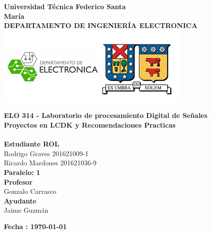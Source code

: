 \documentclass[12pt,a4paper]{article} %
\begin{document}
\begin{titlepage}
\begin{center}
\textbf{\LARGE Universidad Técnica Federico Santa}\\[0.25cm]
\textbf{\LARGE María}\\[0.5cm]
\textbf{\large DEPARTAMENTO DE INGENIERÍA ELECTRONICA}\\[0.2cm]
\vspace{20pt}
\includegraphics{logousm.png}\\[1cm]

\par
\vspace{15pt}
\textbf{\Large ELO 314 - Laboratorio de procesamiento Digital de Señales}\\
\vspace{15pt}
\myrule[1pt][7pt]
\textbf{\LARGE Proyectos en LCDK y Recomendaciones Practicas }\\[0.25cm]
\vspace{15pt}
\textbf{\large  }\\
\myrule[1pt][7pt]
\vspace{55pt}
\textbf{\large Estudiante \hspace{75pt} ROL}\\
    \hspace{0pt}Rodrigo Graves\hspace{80pt} 201621009-1 \\
     Ricardo Mardones      \hspace{60pt} 201621036-9 \\
   


\vspace{30pt}
\textbf{\large Paralelo: \hspace{30pt} 1}\\

\vspace{35pt}
\textbf {\large Profesor}\\[0.2cm]
\Large { Gonzalo Carrasco}\\[0.1cm]
\textbf {\large Ayudante}\\[0.2cm]
\Large {Jaime Guzmán}\\[0.1cm]
\end{center}

\par
\vfill
\begin{center}
\textbf{Fecha : \today}\\
\end{center}

\end{titlepage}
\end{document}
